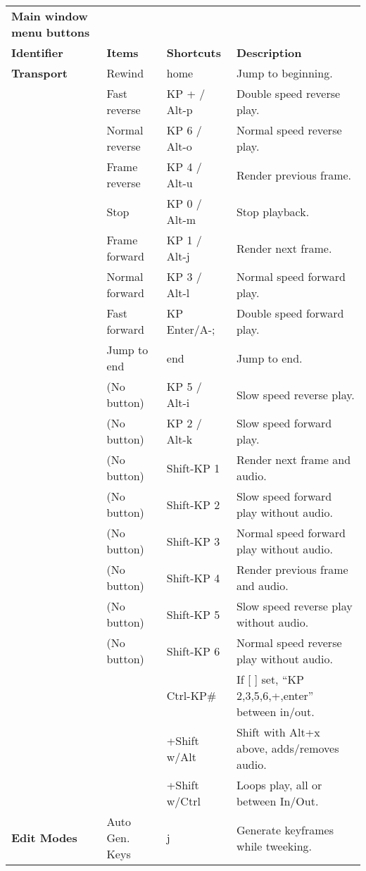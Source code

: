 \begin{longtable}[h]{>{\bfseries}p{}p{}p{}p{}}
  \toprule
  \multicolumn{4}{c}%
  {\textcolor{CinRed}{\textbf{Main window menu buttons}}} \\
  Identifier & \textbf{Items} & \textbf{Shortcuts} & \textbf{Description}\\
  \midrule
  \endhead
  \textcolor{CinBlueText}{Transport} & Rewind & home & Jump to beginning. \\
  & Fast reverse & KP + / Alt-p & Double speed reverse play. \\
  & Normal reverse & KP 6 / Alt-o & Normal speed reverse play. \\
  & Frame reverse & KP 4 / Alt-u & Render previous frame. \\
  & Stop & KP 0 / Alt-m & Stop playback. \\
  & Frame forward & KP 1 / Alt-j & Render next frame. \\
  & Normal forward & KP 3 / Alt-l & Normal speed forward play. \\
  & Fast forward & KP Enter/A-; & Double speed forward play. \\
  & Jump to end & end & Jump to end. \\
  & (No button) & KP 5 / Alt-i & Slow speed reverse play. \\
  & (No button) & KP 2 / Alt-k & Slow speed forward play. \\
  & (No button) & Shift-KP 1 & Render next frame and audio. \\
  & (No button) & Shift-KP 2 & Slow speed forward play without audio. \\
  & (No button) & Shift-KP 3 & Normal speed forward play without audio. \\
  & (No button) & Shift-KP 4 & Render previous frame and audio. \\
  & (No button) & Shift-KP 5 & Slow speed reverse play without audio. \\
  & (No button) & Shift-KP 6 & Normal speed reverse play without audio. \\
  &  & Ctrl-KP\# & If [ ] set, “KP 2,3,5,6,+,enter” between in/out. \\
  &  & +Shift w/Alt & Shift with Alt+x above, adds/removes audio. \\
  &  & +Shift w/Ctrl & Loops play, all or between In/Out. \\
  \midrule
  \textcolor{CinBlueText}{Edit Modes} & Auto Gen. Keys & j & Generate keyframes while tweeking. \\

\end{longtable}
